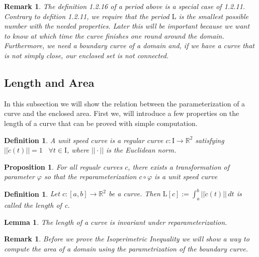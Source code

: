 \documentclass[a4paper]{book}
\newtheorem{lemma}[theorem]{Lemma}%
\newtheorem{remark}[theorem]{Remark}%
\newtheorem{proposition}[theorem]{Proposition}%
\newtheorem{definition}[theorem]{Definition}%
\numberwithin{theorem}{section}%
\begin{document}
\begin{remark}
    The definition 1.2.16 of a period above is a special case of 1.2.11. Contrary to defition 1.2.11, we require that the period $\mathrm{L}$ is the smallest possible number with the needed properties. Later this will be important because we want to know at which time the curve finishes one round around the domain. Furthermore, we need a boundary curve of a domain and, if we have a curve that is not simply close, our enclosed set is not connected.
\end{remark}

\subsection{Length and Area}
In this subsection we will show the relation between the parameterization of a curve and the enclosed area. First we, will introduce a few properties on the length of a curve that can be proved with simple computation.

\begin{definition}
    A unit speed curve is a regular curve $c:\mathrm{I}\to\mathbb{R}^2$ satisfying $||\dot{c}(t)||=1\;\;\;\forall t\in\mathrm{I}$, where $||\cdot||$ is the Euclidean norm.
\end{definition}

\begin{proposition}
    For all regualr curves $c$, there exists a transformation of parameter $\varphi$ so that the reparameterization $c\circ\varphi$ is a unit speed curve
\end{proposition}

\begin{definition}
    Let $c:[a,b]\to\mathbb{R}^2$ be a curve. Then $\mathrm{L}[c]:=\int_{a}^{b}||\dot{c}(t)||\,dt$ is called the length of c.
\end{definition}

\begin{lemma}
    The length of a curve is invariant under reparameterization.
\end{lemma}

\begin{remark}
    Before we prove the Isoperimetric Inequality we will show a way to compute the area of a domain using the parametrization of the boundary curve.
\end{remark}
\end{document}
